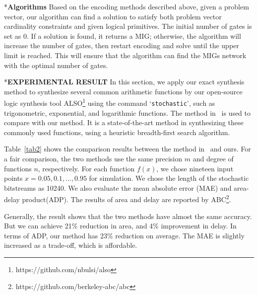 \documentclass[conference,letterpaper]{IEEEtran}
\makeatletter
\renewcommand{\section}{\@startsection{section}{1}{0mm}
    {-\baselineskip}{0.001\baselineskip}{\bf\leftline}}
\renewcommand{\subsection}{\@startsection{subsection}{1}{0mm}
	{-\baselineskip}{0.001\baselineskip}{\bf\leftline}}
\makeatother
\begin{document}
\subsection*{\textbf{Algorithms }}
Based on the encoding methods described above, given a problem vector, our algorithm can find a solution to satisfy both problem vector cardinality constraints and given logical primitives. The initial number of gates is set as 0. If a solution is found, it returns a MIG; otherwise, the algorithm will increase the number of gates, then restart encoding and solve until the upper limit is reached. This will ensure that the algorithm can find the MIGs network with the optimal number of gates.

\section*{\textbf{\large EXPERIMENTAL RESULT}}
In this section, we apply our exact synthesis method to synthesize several common arithmetic functions by our open-source logic synthesis tool ALSO\footnote{https://github.com/nbulsi/also} using the command `\texttt{stochastic}', such as trigonometric, exponential, and logarithmic functions. The method in~\cite{Cube-Assignment} is used to compare with our method. It is a state-of-the-art method in synthesizing these commonly used functions, using a heuristic breadth-first search algorithm. 

Table~\ref{tab2} shows the comparison results between the method in~\cite{Cube-Assignment} and ours. For a fair comparison, the two methods use the same precision $m$ and degree of functions $n$, respectively. For each function $f(x)$, we chose nineteen input points $x=0.05, 0.1,..., 0.95$ for simulation. We chose the length of the stochastic bitstreams as 10240. We also evaluate the mean absolute error (MAE) and area-delay product(ADP). 
The results of area and delay are reported by ABC\footnote{https://github.com/berkeley-abc/abc}.

Generally, the result shows that the two methods have almost the same accuracy. But we can achieve 21\% reduction in area, and 4\% improvement in delay. In terms of ADP, our method has 23\% reduction on average.
The MAE is slightly increased as a trade-off, which is affordable.
\end{document}
